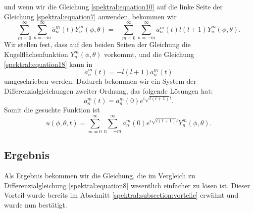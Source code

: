 und wenn wir die Gleichung \eqref{spektral:equation10} auf die linke Seite der Gleichung \eqref{spektral:equation7} anwenden, bekommen wir
\begin{equation}
\sum_{m=0}^{\infty}\sum_{n=-m}^{\infty}\ddot{a}_n^m(t)Y_n^m(\phi, \theta) = -\sum_{m=0}^{\infty}\sum_{n=-m}^{\infty}a_n^m(t)l(l+1)Y_n^m(\phi, \theta).
\label{spektral:equation18}
\end{equation}
Wir stellen fest, dass auf den beiden Seiten der Gleichung die Kugelflächenfunktion $Y_n^m(\phi, \theta)$ vorkommt, und die Gleichung \eqref{spektral:equation18} kann in 
\begin{equation}
\ddot{a}_n^m(t) = -l(l+1)a_n^m(t)
\label{spektral:equation19}
\end{equation}
umgeschrieben werden.
Dadurch bekommen wir ein System der Differenzialgleichungen zweiter Ordnung, das folgende Lösungen hat:
\begin{equation}
a_n^m(t) = a_n^m(0)e^{i\sqrt{l(l+1)}t}.
\label{spektral:equation20}
\end{equation}
Somit die gesuchte Funktion ist
\begin{equation}
u(\phi, \theta, t) = \sum_{m=0}^{\infty}\sum_{n=-m}^{\infty}a_n^m(0)e^{i\sqrt{l(l+1)}t}Y_n^m(\phi, \theta).
\label{spektral:equation21}
\end{equation}

\subsection{Ergebnis
\label{spektral:subsection:ergebnis}}

Als Ergebnis bekommen wir die Gleichung, die im Vergleich zu Differenzialgleichung \eqref{spektral:equation8} wesentlich einfacher zu lösen ist.
Dieser Vorteil wurde bereits im Abschnitt \ref{spektral:subsection:vorteile} erwähnt und wurde nun bestätigt.